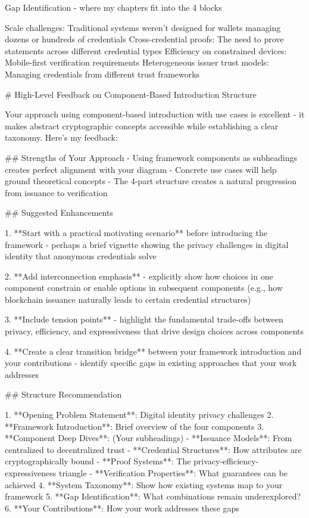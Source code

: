 Gap Identification - where my chapters fit into the 4 blocks

Scale challenges: Traditional systems weren't designed for wallets managing dozens or hundreds of credentials
Cross-credential proofs: The need to prove statements across different credential types
Efficiency on constrained devices: Mobile-first verification requirements
Heterogeneous issuer trust models: Managing credentials from different trust frameworks
















# High-Level Feedback on Component-Based Introduction Structure

Your approach using component-based introduction with use cases is excellent - it makes abstract cryptographic concepts accessible while establishing a clear taxonomy. Here's my feedback:

## Strengths of Your Approach
- Using framework components as subheadings creates perfect alignment with your diagram
- Concrete use cases will help ground theoretical concepts
- The 4-part structure creates a natural progression from issuance to verification

## Suggested Enhancements

1. **Start with a practical motivating scenario** before introducing the framework - perhaps a brief vignette showing the privacy challenges in digital identity that anonymous credentials solve

2. **Add interconnection emphasis** - explicitly show how choices in one component constrain or enable options in subsequent components (e.g., how blockchain issuance naturally leads to certain credential structures)

3. **Include tension points** - highlight the fundamental trade-offs between privacy, efficiency, and expressiveness that drive design choices across components

4. **Create a clear transition bridge** between your framework introduction and your contributions - identify specific gaps in existing approaches that your work addresses

## Structure Recommendation

1. **Opening Problem Statement**: Digital identity privacy challenges
2. **Framework Introduction**: Brief overview of the four components
3. **Component Deep Dives**: (Your subheadings)
   - **Issuance Models**: From centralized to decentralized trust
   - **Credential Structures**: How attributes are cryptographically bound
   - **Proof Systems**: The privacy-efficiency-expressiveness triangle
   - **Verification Properties**: What guarantees can be achieved
4. **System Taxonomy**: Show how existing systems map to your framework
5. **Gap Identification**: What combinations remain underexplored?
6. **Your Contributions**: How your work addresses these gaps

